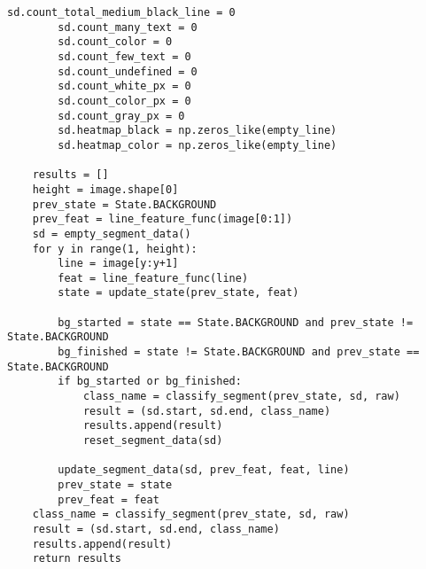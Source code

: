 \newpage

\begin{lstlisting}[caption={Функция для создания первичной или уточненной разметки (часть 2)}, label={lst:}]
        sd.count_total_medium_black_line = 0
        sd.count_many_text = 0
        sd.count_color = 0
        sd.count_few_text = 0
        sd.count_undefined = 0
        sd.count_white_px = 0
        sd.count_color_px = 0
        sd.count_gray_px = 0
        sd.heatmap_black = np.zeros_like(empty_line)
        sd.heatmap_color = np.zeros_like(empty_line)

    results = []
    height = image.shape[0]
    prev_state = State.BACKGROUND
    prev_feat = line_feature_func(image[0:1])
    sd = empty_segment_data()
    for y in range(1, height):
        line = image[y:y+1]
        feat = line_feature_func(line)
        state = update_state(prev_state, feat)

        bg_started = state == State.BACKGROUND and prev_state != State.BACKGROUND
        bg_finished = state != State.BACKGROUND and prev_state == State.BACKGROUND
        if bg_started or bg_finished:
            class_name = classify_segment(prev_state, sd, raw)
            result = (sd.start, sd.end, class_name)
            results.append(result)
            reset_segment_data(sd)

        update_segment_data(sd, prev_feat, feat, line)
        prev_state = state
        prev_feat = feat
    class_name = classify_segment(prev_state, sd, raw)
    result = (sd.start, sd.end, class_name)
    results.append(result)
    return results
\end{lstlisting}

